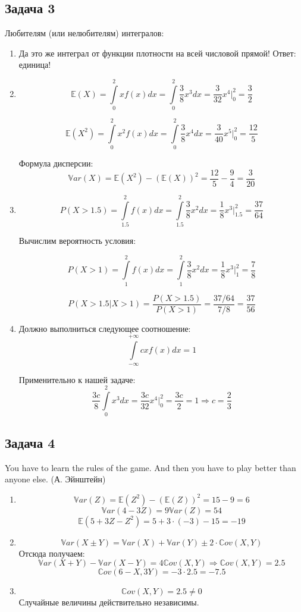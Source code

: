 \documentclass[a4paper,12pt]{article}
\theoremstyle{plain}                         %
\theoremstyle{definition}                  %
\theoremstyle{remark}                      %
\begin{document}
\newpage

\subsection*{Задача 3}
Любителям (или нелюбителям) интегралов:
\begin{enumerate}
\item Да это же интеграл от функции плотности на всей числовой прямой! Ответ: единица!
\item $$\mathbb{E}(X) = \int \limits_0^2 x f(x) dx = \int \limits_0^2 \dfrac{3}{8} x^3 dx = \dfrac{3}{32} x^4 |_0^2 = \dfrac{3}{2}$$

$$\mathbb{E}(X^2) = \int \limits_0^2 x^2 f(x) dx = \int \limits_0^2 \dfrac{3}{8} x^4 dx = \dfrac{3}{40} x^5 |_0^2 = \dfrac{12}{5}$$

Формула дисперсии:
$$\mathbb{V}ar(X) = \mathbb{E}(X^2) - \left(\mathbb{E}(X) \right)^2 = \dfrac{12}{5} - \dfrac{9}{4} = \dfrac{3}{20} $$

\item $$P(X>1.5) = \int \limits_{1.5}^2 f(x) dx = \int \limits_{1.5}^2 \dfrac{3}{8} x^2 dx = \dfrac{1}{8} x^3 |_{1.5}^2 = \dfrac{37}{64}$$

Вычислим вероятность условия:

$$P(X>1) = \int \limits_1^2 f(x) dx = \int \limits_1^2 \dfrac{3}{8} x^2 dx = \dfrac{1}{8} x^3 |_1^2 = \dfrac{7}{8}$$

$$P(X>1.5 | X>1) = \dfrac{P(X>1.5)}{P( X>1)} = \dfrac{37/64}{7/8} = \dfrac{37}{56}$$

\item Должно выполниться следующее соотношение:
$$\int \limits_{-\infty}^{+\infty} c x f(x) dx  = 1$$

Применительно к нашей задаче:
$$\dfrac{3c}{8} \int \limits_0^2 x^3 dx  = \dfrac{3c}{32} x^4 |_0^2 = \dfrac{3c}{2} = 1 \Rightarrow c = \dfrac{2}{3}$$
\end{enumerate}

\subsection*{Задача 4}

You have to learn the rules of the game. And then you have to play better than anyone else. (А. Эйнштейн)

\begin{enumerate}
\item $$\mathbb{V}ar(Z) = \mathbb{E}(Z^2) - (\mathbb{E}(Z))^2 = 15 - 9 = 6$$
$$\mathbb{V}ar(4 - 3Z) = 9\mathbb{V}ar(Z) = 54$$
$$\mathbb{E}(5 + 3Z - Z^2) = 5 + 3\cdot (-3)  - 15 = -19 $$

\item $$\mathbb{V}ar(X \pm Y) = \mathbb{V}ar(X) + \mathbb{V}ar(Y) \pm 2 \cdot \mathbb{C}ov(X, Y)$$
Отсюда получаем:
$$\mathbb{V}ar(X + Y) - \mathbb{V}ar(X - Y) = 4 \mathbb{C}ov(X, Y) \Rightarrow \mathbb{C}ov(X, Y) = 2.5$$
$$\mathbb{C}ov(6 - X, 3Y) = -3\cdot 2.5 = -7.5$$

\item $$\mathbb{C}ov(X, Y) = 2.5 \ne 0$$ Случайные величины действительно независимы.
\end{enumerate}
\end{document}
